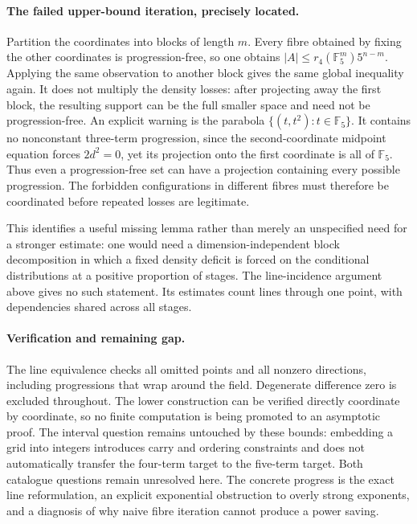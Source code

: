 \documentclass[11pt,a4paper]{article}
\newcommand{\F}{\mathbb{F}}
\begin{document}
\paragraph{The failed upper-bound iteration, precisely located.}
Partition the coordinates into blocks of length $m$. Every fibre obtained by fixing the other coordinates is progression-free, so one obtains $|A|\leq r_4(\F_5^m)5^{n-m}$. Applying the same observation to another block gives the same global inequality again. It does not multiply the density losses: after projecting away the first block, the resulting support can be the full smaller space and need not be progression-free. An explicit warning is the parabola $\{(t,t^2):t\in\F_5\}$. It contains no nonconstant three-term progression, since the second-coordinate midpoint equation forces $2d^2=0$, yet its projection onto the first coordinate is all of $\F_5$. Thus even a progression-free set can have a projection containing every possible progression. The forbidden configurations in different fibres must therefore be coordinated before repeated losses are legitimate.

This identifies a useful missing lemma rather than merely an unspecified need for a stronger estimate: one would need a dimension-independent block decomposition in which a fixed density deficit is forced on the conditional distributions at a positive proportion of stages. The line-incidence argument above gives no such statement. Its estimates count lines through one point, with dependencies shared across all stages.

\paragraph{Verification and remaining gap.}
The line equivalence checks all omitted points and all nonzero directions, including progressions that wrap around the field. Degenerate difference zero is excluded throughout. The lower construction can be verified directly coordinate by coordinate, so no finite computation is being promoted to an asymptotic proof. The interval question remains untouched by these bounds: embedding a grid into integers introduces carry and ordering constraints and does not automatically transfer the four-term target to the five-term target. Both catalogue questions remain unresolved here. The concrete progress is the exact line reformulation, an explicit exponential obstruction to overly strong exponents, and a diagnosis of why naive fibre iteration cannot produce a power saving.
\end{document}
